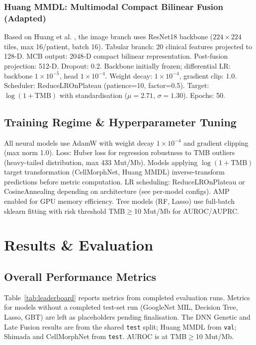 \documentclass[11pt,a4paper]{article}
\begin{document}
\subsubsection{Huang MMDL: Multimodal Compact Bilinear Fusion (Adapted)}
Based on Huang et al. \cite{huang2022}, the image branch uses ResNet18 backbone ($224\times224$ tiles, max 16/patient, batch 16). Tabular branch: 20 clinical features projected to 128-D. MCB output: 2048-D compact bilinear representation. Post-fusion projection: 512-D. Dropout: 0.2. Backbone initially frozen; differential LR: backbone $1\times10^{-5}$, head $1\times10^{-4}$. Weight decay: $1\times10^{-4}$, gradient clip: 1.0. Scheduler: ReduceLROnPlateau (patience=10, factor=0.5). Target: $\log(1+\text{TMB})$ with standardisation ($\mu=2.71$, $\sigma=1.30$). Epochs: 50.

\subsection{Training Regime \& Hyperparameter Tuning}
\label{subsec:training}
All neural models use AdamW with weight decay $1\times10^{-4}$ and gradient clipping (max norm 1.0). Loss: Huber loss for regression robustness to TMB outliers (heavy-tailed distribution, max 433 Mut/Mb). Models applying $\log(1+\text{TMB})$ target transformation (CellMorphNet, Huang MMDL) inverse-transform predictions before metric computation. LR scheduling: ReduceLROnPlateau or CosineAnnealing depending on architecture (see per-model configs). AMP enabled for GPU memory efficiency. Tree models (RF, Lasso) use full-batch sklearn fitting with risk threshold TMB$\geq$10 Mut/Mb for AUROC/AUPRC.

\section{Results \& Evaluation}
\label{sec:results}

\subsection{Overall Performance Metrics}
\label{subsec:table1}
Table~\ref{tab:leaderboard} reports metrics from completed evaluation runs. Metrics for models without a completed test-set run (GoogleNet MIL, Decision Tree, Lasso, GBT) are left as placeholders pending finalisation. The DNN Genetic and Late Fusion results are from the shared \texttt{test} split; Huang MMDL from \texttt{val}; Shimada and CellMorphNet from \texttt{test}. AUROC is at TMB$\geq$10 Mut/Mb.
\end{document}
